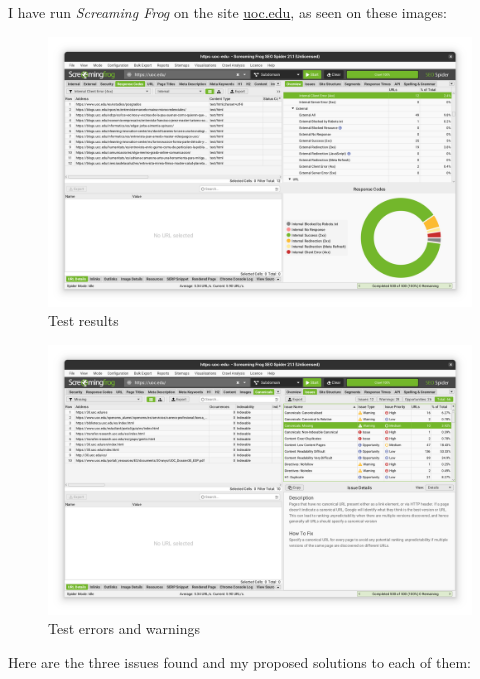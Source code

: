 \documentclass[
]{report}
\begin{document}
I have run \emph{Screaming Frog} on the site
\href{https://uoc.edu}{uoc.edu}, as seen on these images:

\begin{figure}[H]

{\centering \includegraphics{./img/frog.png}

}

\caption{Test results}

\end{figure}%
\begin{figure}[H]

{\centering \includegraphics{./img/error.png}

}

\caption{Test errors and warnings}

\end{figure}%

Here are the three issues found and my proposed solutions to each of
them:
\end{document}

